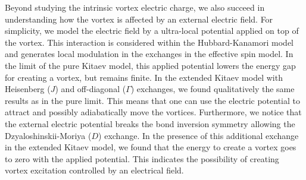 
Beyond studying the intrinsic vortex electric charge, we also succeed in understanding how the vortex is affected by an external electric field. For simplicity, we model the electric field by a ultra-local potential applied on top of the vortex.
This interaction is considered within the Hubbard-Kanamori model and generates local modulation in the exchanges in the effective spin model.
In the limit of the pure Kitaev model, this applied potential lowers the energy gap for creating a vortex, but remains finite.
In the extended Kitaev model with Heisenberg ($J$) and off-diagonal ($\Gamma$) exchanges, we found qualitatively the same results as in the pure limit.
This means that one can use the electric potential to attract and possibly adiabatically move the vortices.
Furthermore, we notice that the external electric potential breaks the bond inversion symmetry allowing the Dzyaloshinskii-Moriya ($D$) exchange. In the presence of this additional exchange in the extended Kitaev model, we found that the energy to create a vortex goes to zero with the applied potential. This indicates the possibility of creating vortex excitation controlled by an electrical field.










